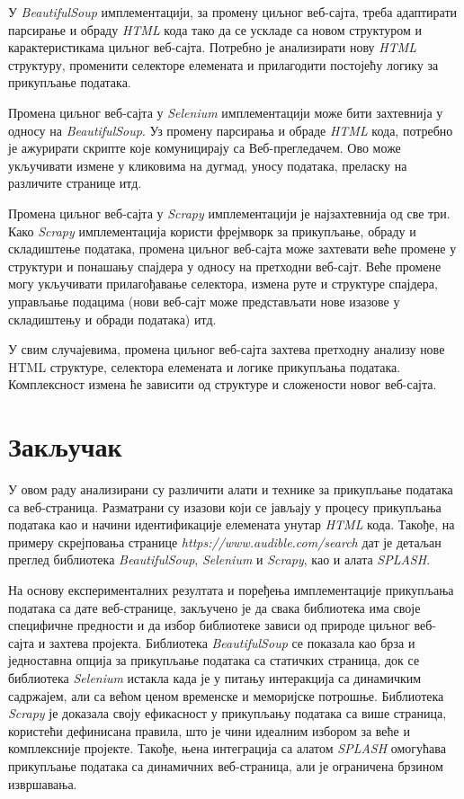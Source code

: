 \documentclass[12pt,oneside]{memoir}
\begin{document}
У \textit{BeautifulSoup} имплементацији, за промену циљног веб-сајта, треба адаптирати парсирање и обраду \textit{HTML} кода тако да се ускладе са новом структуром и карактеристикама циљног веб-сајта. Потребно је анализирати нову \textit{HTML} структуру, променити селекторе елемената и прилагодити постојећу логику за прикупљање података.

Промена циљног веб-сајта у \textit{Selenium} имплементацији може бити захтевнија у односу на \textit{BeautifulSoup}. Уз промену парсирања и обраде \textit{HTML} кода, потребно је ажурирати скрипте које комуницирају са Веб-прегледачем. Ово може укључивати измене у кликовима на дугмад, уносу података, преласку на различите странице итд.

Промена циљног веб-сајта у \textit{Scrapy} имплементацији је најзахтевнија од све три. Како \textit{Scrapy} имплементација користи фрејмворк за прикупљање, обраду и складиштење података, промена циљног веб-сајта може захтевати веће промене у структури и понашању спајдера у односу на претходни веб-сајт. Веће промене могу укључивати прилагођавање селектора, измена руте и структуре спајдера, управљање подацима (нови веб-сајт може представљати нове изазове у складиштењу и обради података) итд.

У свим случајевима, промена циљног веб-сајта захтева претходну анализу нове HTML структуре, селектора елемената и логике прикупљања података. Комплексност измена ће зависити од структуре и сложености новог веб-сајта.

\chapter{Закључак}
\label{chp:zakljucak}
У овом раду анализирани су различити алати и технике за прикупљање података са веб-страница. Разматрани су изазови који се јављају у процесу прикупљања података као и начини идентификације елемената унутар \textit{HTML} кода. Такође, на примеру скрејповања странице 
\textit{https://www.audible.com/search} дат је детаљан преглед библиотека \textit{BeautifulSoup}, \textit{Selenium} и \textit{Scrapy}, као и алата \textit{SPLASH}.

На основу експерименталних резултата и поређења имплементације прикупљања података са дате веб-странице, закључено је да свака библиотека има своје специфичне предности и да избор библиотеке зависи од природе циљног веб-сајта и захтева пројекта. Библиотека \textit{BeautifulSoup} се показала као брза и једноставна опција за прикупљање података са статичких страница, док се библиотека \textit{Selenium} истакла када је у питању интеракција са динамичким садржајем, али са већом ценом временске и меморијске потрошње. Библиотека \textit{Scrapy} је доказала своју ефикасност у прикупљању података са више страница, користећи дефинисана правила, што је чини идеалним избором за веће и комплексније пројекте. Такође, њена интеграција са алатом \textit{SPLASH} омогућава прикупљање података са динамичних веб-страница, али је ограничена брзином извршавања.
\end{document}
